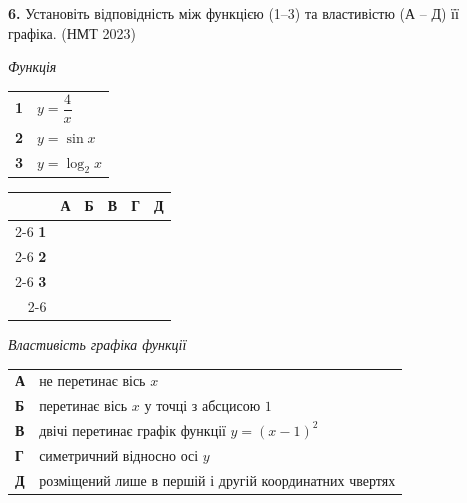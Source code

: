 \documentclass[14pt]{extarticle}
\newcommand{\nmtyear}[1]{\hfill{\small\color{yearcolor}(НМТ #1)}}
\begin{document}
\vspace{0.7cm}

\noindent\textbf{6.} Установіть відповідність між функцією (1–3) та властивістю (А – Д) її графіка. \nmtyear{2023}

\vspace{0.3cm}

\noindent
\begin{minipage}[t]{0.45\textwidth}
    \textit{Функція} \par \vspace{0.2cm}
    \begin{tabular}{@{}p{0.5cm} p{5cm}@{}}
    \textbf{1} & $y=\dfrac{4}{x}$ \\[0.3cm]
    \textbf{2} & $y=\sin x$ \\[0.3cm]
    \textbf{3} & $y=\log_2 x$ \\
    \end{tabular}
    
    \vspace{0.5cm}
    
    \begingroup
    \setlength{\tabcolsep}{4pt}
    \renewcommand{\arraystretch}{1.2}
    \small
    \begin{tabular}{r|c|c|c|c|c|}
         \multicolumn{1}{c}{} & \multicolumn{1}{c}{\textbf{А}} & \multicolumn{1}{c}{\textbf{Б}} & \multicolumn{1}{c}{\textbf{В}} & \multicolumn{1}{c}{\textbf{Г}} & \multicolumn{1}{c}{\textbf{Д}} \\ \cline{2-6}
         \textbf{1} & & & & & \\ \cline{2-6}
         \textbf{2} & & & & & \\ \cline{2-6}
         \textbf{3} & & & & & \\ \cline{2-6}
    \end{tabular}
    \endgroup
\end{minipage}%
\hfill
\begin{minipage}[t]{0.50\textwidth}
    \textit{Властивість графіка функції} \par \vspace{0.2cm}
    \begin{tabular}{@{}p{0.5cm} p{7.5cm}@{}}
    \textbf{А} & не перетинає вісь $x$ \\[0.3cm]
    \textbf{Б} & перетинає вісь $x$ у точці з абсцисою $1$ \\[0.3cm]
    \textbf{В} & двічі перетинає графік функції $y=(x-1)^2$ \\[0.3cm]
    \textbf{Г} & симетричний відносно осі $y$ \\[0.3cm]
    \textbf{Д} & розміщений лише в першій і другій координатних чвертях \\
    \end{tabular}
\end{minipage}
\end{document}
